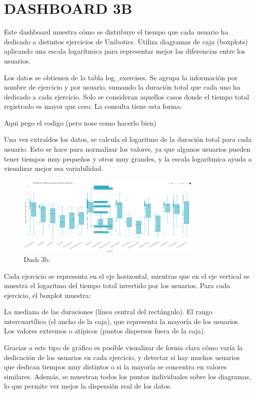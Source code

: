 \documentclass[a4paper, 12pt]{book}
\begin{document}
\section{DASHBOARD 3B}

Este dashboard muestra cómo se distribuye el tiempo que cada usuario ha dedicado a distintos ejercicios de Unibotics. Utiliza diagramas de caja (boxplots) aplicando una escala logarítmica para representar mejor las diferencias entre los usuarios.

Los datos se obtienen de la tabla log\_exercises. Se agrupa la información por nombre de ejercicio y por usuario, sumando la duración total que cada uno ha dedicado a cada ejercicio. Solo se consideran aquellos casos donde el tiempo total registrado es mayor que cero.
La consulta tiene esta forma:

Aqui pego el codigo (pero nose como hacerlo bien)

Una vez extraídos los datos, se calcula el logaritmo de la duración total para cada usuario. Esto se hace para normalizar los valores, ya que algunos usuarios pueden tener tiempos muy pequeños y otros muy grandes, y la escala logarítmica ayuda a visualizar mejor esa variabilidad.

\begin{figure}
  \centering
  \includegraphics[width=9cm, keepaspectratio]{img/3bb.png}
  \caption{Dash 3b.}\label{fig:3b}
\end{figure}

Cada ejercicio se representa en el eje horizontal, mientras que en el eje vertical se muestra el logaritmo del tiempo total invertido por los usuarios. Para cada ejercicio, el boxplot muestra:

La mediana de las duraciones (línea central del rectángulo).
El rango intercuartílico (el ancho de la caja), que representa la mayoría de los usuarios.
Los valores extremos o atípicos (puntos dispersos fuera de la caja).

Gracias a este tipo de gráfico es posible visualizar de forma clara cómo varía la dedicación de los usuarios en cada ejercicio, y detectar si hay muchos usuarios que dedican tiempos muy distintos o si la mayoría se concentra en valores similares. Además, se muestran todos los puntos individuales sobre los diagramas, lo que permite ver mejor la dispersión real de los datos.
\end{document}
